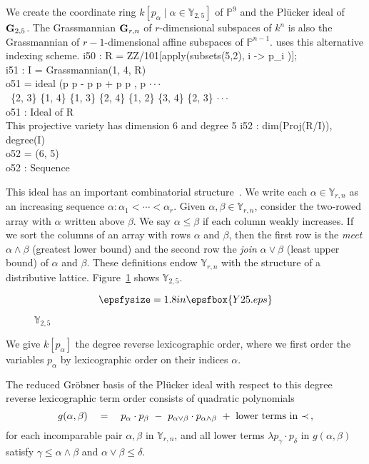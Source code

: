 We create the coordinate ring 
$k[p_\alpha\mid\alpha\in{\mathbb Y}_{2,5}]$ of ${\mathbb P}^9$ and the
Pl\"ucker ideal of ${\bf G}_{2,5}$.
The Grassmannian ${\bf G}_{r,n}$ of $r$-dimensional subspaces of $k^n$ is also
the Grassmannian of $r{-}1$-dimensional affine subspaces of 
${\mathbb P}^{n-1}$.
\Mtwo{} uses this alternative indexing scheme.
%
\beginOutput
i50 : R = ZZ/101[apply(subsets(5,2), i -> p_i )];\\
\endOutput
%
\beginOutput
i51 : I = Grassmannian(1, 4, R)\\
\emptyLine
o51 = ideal (p      p       - p      p       + p      p      , p       $\cdot\cdot\cdot$\\
\              \{2, 3\} \{1, 4\}    \{1, 3\} \{2, 4\}    \{1, 2\} \{3, 4\}   \{2, 3\} $\cdot\cdot\cdot$\\
\emptyLine
o51 : Ideal of R\\
\endOutput
%
This projective variety has dimension 6 and degree 5
%
\beginOutput
i52 : dim(Proj(R/I)), degree(I)\\
\emptyLine
o52 = (6, 5)\\
\emptyLine
o52 : Sequence\\
\endOutput
%

This ideal has an important combinatorial 
structure~\cite[Example 11.9]{SO:Sturmfels_GBCP}. 
We write each $\alpha\in{\mathbb Y}_{r,n}$ as an increasing
sequence $\alpha\colon\alpha_1<\cdots<\alpha_r$. 
Given $\alpha,\beta\in{\mathbb Y}_{r,n}$, consider the 
two-rowed array with $\alpha$ written above $\beta$.
We say $\alpha\leq \beta$ if each column weakly increases.
If we sort the columns of an array with rows $\alpha$ and
$\beta$, then the first row is the {\it meet} $\alpha\wedge\beta$ 
(greatest lower bound) and the
second row the {\it join} $\alpha\vee\beta$ (least upper bound) of $\alpha$
and $\beta$. 
These definitions endow ${\mathbb Y}_{r,n}$ with the structure of a
distributive lattice.
Figure~\ref{fig2} shows ${\mathbb Y}_{2,5}$.
\begin{figure}
$$
 \epsfysize=1.8in \epsfbox{Y25.eps}
$$\caption{${\mathbb Y}_{2,5}$\label{fig2}}
\end{figure}

We give $k[p_\alpha]$ the degree reverse
lexicographic order, where we first order the variables $p_\alpha$ by
lexicographic order on their indices $\alpha$.

\begin{theorem}\label{PluckerIdeal}
The reduced Gr\"obner basis of the Pl\"ucker
ideal with respect to this degree 
reverse lexicographic term order consists of quadratic
polynomials 
$$
  g(\alpha,\beta)\quad=\quad
  p_\alpha\cdot p_\beta \ -\  p_{\alpha\vee\beta}\cdot p_{\alpha\wedge\beta} 
  \ +\ \hbox{lower terms in $\prec$}\,,
$$
for each incomparable pair $\alpha,\beta$ in
${\mathbb Y}_{r,n}$,
and all lower terms $\lambda p_\gamma\cdot p_\delta$ in $g(\alpha,\beta)$
satisfy $\gamma\leq \alpha\wedge\beta$ and $\alpha\vee\beta\leq \delta$.
\end{theorem}


